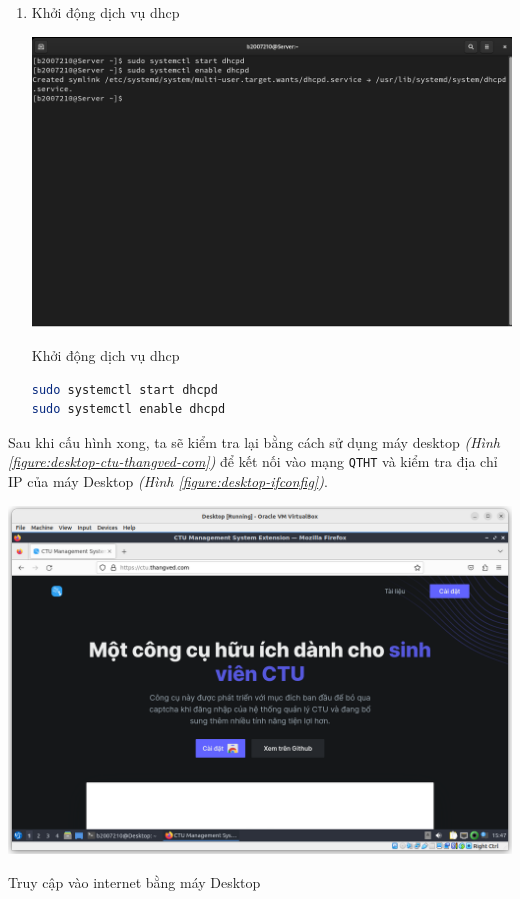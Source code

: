 \documentclass[a4paper, 11pt]{article}
\begin{document}
\begin{enumerate}
    \item Khởi động dịch vụ dhcp \hfill\\
          \begin{minipage}
              {\linewidth}
              \captionsetup{type=figure}
              \centering
              \includegraphics[width=\linewidth]{images/start-enable-dhcpd.png}
              \caption{Khởi động dịch vụ dhcp}
              \label{figure:start-enable-dhcpd}
          \end{minipage}
          \begin{lstlisting}[language=bash, caption=Khởi động dịch vụ dhcp]
sudo systemctl start dhcpd
sudo systemctl enable dhcpd
\end{lstlisting}
\end{enumerate}

Sau khi cấu hình xong, ta sẽ kiểm tra lại bằng cách sử dụng máy desktop \textit{(Hình \ref{figure:desktop-ctu-thangved-com})} để kết nối vào mạng \texttt{QTHT} và kiểm tra địa chỉ IP của máy Desktop \textit{(Hình \ref{figure:desktop-ifconfig})}.

\begin{minipage}
    {\linewidth}
    \captionsetup{type=figure}
    \centering
    \includegraphics[width=\linewidth]{images/desktop-ctu-thangved-com.png}
    \caption{Truy cập vào internet bằng máy Desktop}
    \label{figure:desktop-ctu-thangved-com}
\end{minipage}
\end{document}
